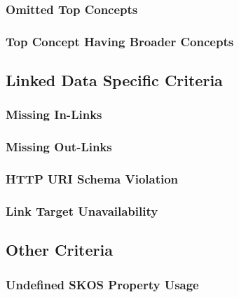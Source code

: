 \subsubsection{Omitted Top Concepts}


\subsubsection{Top Concept Having Broader Concepts}



\subsection{Linked Data Specific Criteria}

\subsubsection{Missing In-Links}

\subsubsection{Missing Out-Links}

\subsubsection{HTTP URI Schema Violation}

\subsubsection{Link Target Unavailability}



\subsection{Other Criteria}

\subsubsection{Undefined SKOS Property Usage}




